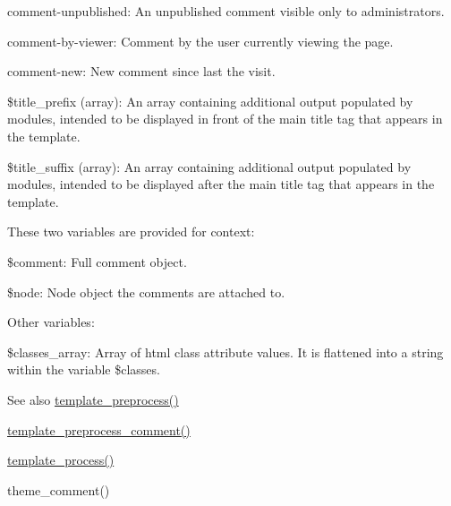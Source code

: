 \begin{DoxyItemize}
\begin{DoxyItemize}
\item comment-\/unpublished: An unpublished comment visible only to administrators.
\item comment-\/by-\/viewer: Comment by the user currently viewing the page.
\item comment-\/new: New comment since last the visit.
\end{DoxyItemize}
\item \$title\_\-prefix (array): An array containing additional output populated by modules, intended to be displayed in front of the main title tag that appears in the template.
\item \$title\_\-suffix (array): An array containing additional output populated by modules, intended to be displayed after the main title tag that appears in the template.
\end{DoxyItemize}

These two variables are provided for context:
\begin{DoxyItemize}
\item \$comment: Full comment object.
\item \$node: Node object the comments are attached to.
\end{DoxyItemize}

Other variables:
\begin{DoxyItemize}
\item \$classes\_\-array: Array of html class attribute values. It is flattened into a string within the variable \$classes.
\end{DoxyItemize}

\begin{DoxySeeAlso}{See also}
\hyperlink{includes_2theme_8inc_a3eeb7bcdba7ef4859f99586da264d347}{template\_\-preprocess()} 

\hyperlink{comment_8module_a48adb63c53357fde9aea892ba131f3db}{template\_\-preprocess\_\-comment()} 

\hyperlink{includes_2theme_8inc_a9b4d56c55dab2c59b7af6f71d6b1a940}{template\_\-process()} 

theme\_\-comment() 
\end{DoxySeeAlso}
